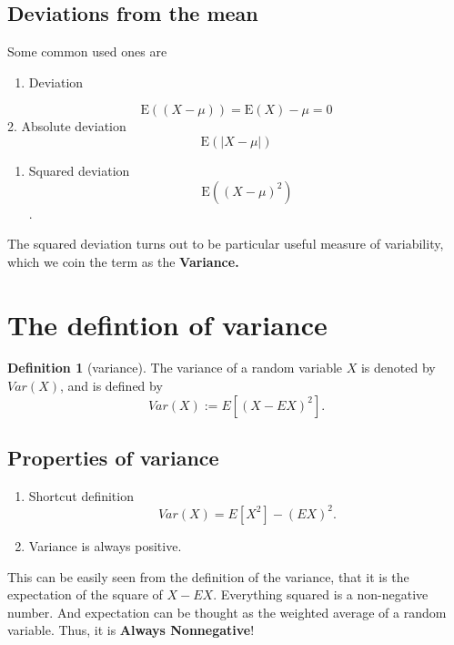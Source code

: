 \documentclass[
]{book}
\providecommand{\tightlist}{%
  \setlength{\itemsep}{0pt}\setlength{\parskip}{0pt}}
\theoremstyle{definition}
\newtheorem{definition}{Definition}[chapter]
\theoremstyle{definition}
\theoremstyle{definition}
\theoremstyle{definition}
\theoremstyle{remark}
\begin{document}
\subsection{Deviations from the mean}\label{deviations-from-the-mean}

Some common used ones are

\begin{enumerate}
\def\labelenumi{\arabic{enumi}.}
\tightlist
\item
  Deviation
\end{enumerate}

\[\mbox{E}((X- \mu)) = \mbox{E}(X)- \mu = 0\]
2. Absolute deviation
\[ \mbox{E} \left(| X - \mu |\right)\]

\begin{enumerate}
\def\labelenumi{\arabic{enumi}.}
\setcounter{enumi}{2}
\tightlist
\item
  Squared deviation
  \[ \mbox{E} \left((X-\mu)^2\right) \].
\end{enumerate}

The squared deviation turns out to be particular useful measure of variability, which we coin the term as the \textbf{Variance.}

\section{The defintion of variance}\label{the-defintion-of-variance}

\begin{definition}[variance]
The variance of a random variable \(X\) is denoted by \(Var(X)\), and is defined by
\[
  Var(X) := E[(X-EX)^2].
\]
\end{definition}

\subsection{Properties of variance}\label{properties-of-variance}

\begin{enumerate}
\def\labelenumi{\arabic{enumi}.}
\item
  Shortcut definition
  \[
    Var(X) = E[X^2] - (E X)^2.
  \]
\item
  Variance is always positive.
\end{enumerate}

This can be easily seen from the definition of the variance, that it is the expectation of the square of \(X-EX\). Everything squared is a non-negative number. And expectation can be thought as the weighted average of a random variable. Thus, it is \textbf{Always Nonnegative}!
\end{document}
